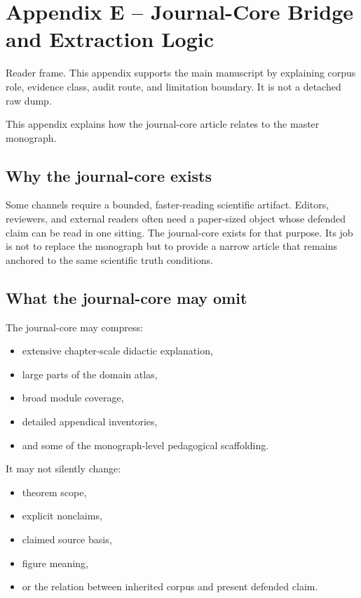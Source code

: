 \section{Appendix E -- Journal-Core Bridge and Extraction Logic}
Reader frame. This appendix supports the main manuscript by explaining corpus role, evidence class, audit route, and limitation boundary. It is not a detached raw dump.

\label{sec:oc13-journal-core-bridge}

This appendix explains how the journal-core article relates to the master monograph.

\subsection{Why the journal-core exists}

Some channels require a bounded, faster-reading scientific artifact.
Editors, reviewers, and external readers often need a paper-sized object whose defended claim can
be read in one sitting.
The journal-core exists for that purpose.
Its job is not to replace the monograph but to provide a narrow article that remains anchored to
the same scientific truth conditions.

\subsection{What the journal-core may omit}

The journal-core may compress:

\begin{itemize}
\item extensive chapter-scale didactic explanation,
\item large parts of the domain atlas,
\item broad module coverage,
\item detailed appendical inventories,
\item and some of the monograph-level pedagogical scaffolding.
\end{itemize}

It may not silently change:

\begin{itemize}
\item theorem scope,
\item explicit nonclaims,
\item claimed source basis,
\item figure meaning,
\item or the relation between inherited corpus and present defended claim.
\end{itemize}

